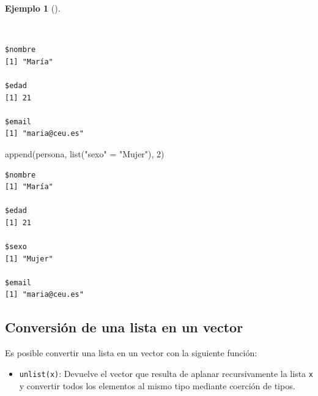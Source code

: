 \documentclass[
  spanish,
  a4paper,
]{scrreport}
\newenvironment{Shaded}{\begin{snugshade}}{\end{snugshade}}
\newcommand{\DecValTok}[1]{\textcolor[rgb]{0.68,0.00,0.00}{#1}}
\newcommand{\FunctionTok}[1]{\textcolor[rgb]{0.28,0.35,0.67}{#1}}
\newcommand{\NormalTok}[1]{\textcolor[rgb]{0.00,0.23,0.31}{#1}}
\newcommand{\OtherTok}[1]{\textcolor[rgb]{0.00,0.23,0.31}{#1}}
\newcommand{\SpecialCharTok}[1]{\textcolor[rgb]{0.37,0.37,0.37}{#1}}
\newcommand{\StringTok}[1]{\textcolor[rgb]{0.13,0.47,0.30}{#1}}
\providecommand{\tightlist}{%
  \setlength{\itemsep}{0pt}\setlength{\parskip}{0pt}}
\theoremstyle{definition}
\theoremstyle{definition}
\newtheorem{example}{Ejemplo}[chapter]
\theoremstyle{remark}
\begin{document}
\begin{example}[]\protect\hypertarget{exm-añadir-elementos-listas}{}\label{exm-añadir-elementos-listas}

~

\begin{Shaded}
\end{Shaded}

\begin{verbatim}
$nombre
[1] "María"

$edad
[1] 21

$email
[1] "maria@ceu.es"
\end{verbatim}

\begin{Shaded}
\begin{Highlighting}[]
\FunctionTok{append}\NormalTok{(persona, }\FunctionTok{list}\NormalTok{(}\StringTok{"sexo"} \OtherTok{=} \StringTok{"Mujer"}\NormalTok{), }\DecValTok{2}\NormalTok{)}
\end{Highlighting}
\end{Shaded}

\begin{verbatim}
$nombre
[1] "María"

$edad
[1] 21

$sexo
[1] "Mujer"

$email
[1] "maria@ceu.es"
\end{verbatim}

\end{example}

\subsection{Conversión de una lista en un
vector}\label{conversiuxf3n-de-una-lista-en-un-vector}

Es posible convertir una lista en un vector con la siguiente función:

\begin{itemize}
\tightlist
\item
  \texttt{unlist(x)}: Devuelve el vector que resulta de aplanar
  recursivamente la lista \texttt{x} y convertir todos los elementos al
  mismo tipo mediante coerción de tipos.
\end{itemize}
\end{document}
